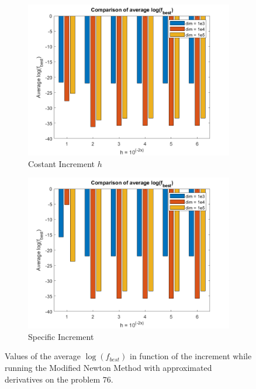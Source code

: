\begin{figure}[htbp]
    \centering
    \begin{subfigure}[t]{0.45\textwidth}  %
        \centering
        \includegraphics[width=\textwidth]{img/pb76_MN_difffinite_COST_log(fbest).png}
        \caption{Costant Increment $h$}
    \end{subfigure}
    \hspace{1cm} %
    \begin{subfigure}[t]{0.45\textwidth}
        \centering
        \includegraphics[width=\textwidth]{img/pb76_MN_difffinite_REL_log(fbest).png}
        \caption{Specific Increment }
    \end{subfigure}
    \caption{ \small Values of the average $\log(f_{best})$ in function of the increment while running the Modified Newton Method with approximated derivatives on the problem $76$.}
    \label{logfbest_difffinite76}
\end{figure}

